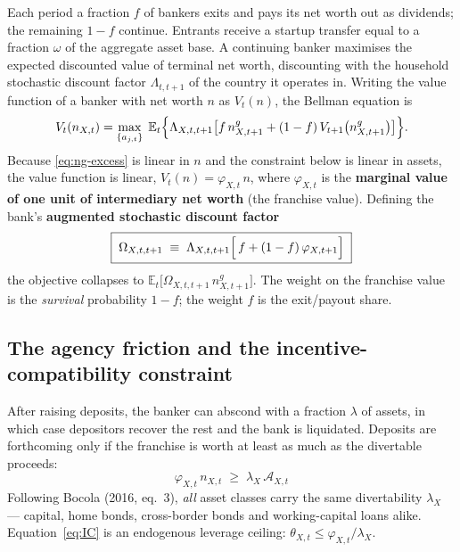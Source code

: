 \documentclass[11pt]{article}
\numberwithin{equation}{section}
\newcommand{\E}{\mathbb{E}}
\theoremstyle{definition}
\theoremstyle{plain}
\theoremstyle{remark}
\begin{document}
Each period a fraction $f$ of bankers exits and pays its net worth out as dividends;
the remaining $1-f$ continue. Entrants receive a startup transfer equal to a fraction
$\omega$ of the aggregate asset base. A continuing banker maximises the expected
discounted value of terminal net worth, discounting with the household stochastic
discount factor $\Lambda_{t,t+1}$ of the country it operates in. Writing the value
function of a banker with net worth $n$ as $V_t(n)$, the Bellman equation is
\begin{equation}
V_t(n_{X,t})
=\max_{\{a_{j,t}\}}\;
\E_t\Bigl\{\Lambda_{X,t,t+1}\bigl[
   f\,n^{g}_{X,t+1}+(1-f)\,V_{t+1}\bigl(n^{g}_{X,t+1}\bigr)\bigr]\Bigr\}.
\label{eq:bank-bellman}
\end{equation}
Because \eqref{eq:ng-excess} is linear in $n$ and the constraint below is linear in
assets, the value function is linear, $V_t(n)=\varphi_{X,t}\,n$, where
$\varphi_{X,t}$ is the \textbf{marginal value of one unit of intermediary net
worth} (the franchise value). Defining the bank's \textbf{augmented stochastic
discount factor}
\begin{equation}
\boxed{\;
\Omega_{X,t,t+1}\;\equiv\;\Lambda_{X,t,t+1}\Bigl[\,f+(1-f)\,\varphi_{X,t+1}\Bigr]\;}
\label{eq:omega}
\end{equation}
the objective collapses to $\E_t\bigl[\Omega_{X,t,t+1}\,n^{g}_{X,t+1}\bigr]$. The
weight on the franchise value is the \emph{survival} probability $1-f$; the weight
$f$ is the exit/payout share.

\subsection{The agency friction and the incentive-compatibility constraint}

After raising deposits, the banker can abscond with a fraction $\lambda$ of assets,
in which case depositors recover the rest and the bank is liquidated. Deposits are
forthcoming only if the franchise is worth at least as much as the divertable
proceeds:
\begin{equation}
\boxed{\;\varphi_{X,t}\,n_{X,t}\;\ge\;\lambda_X\,\mathcal{A}_{X,t}\;}
\label{eq:IC}
\end{equation}
Following Bocola (2016, eq.~3), \emph{all} asset classes carry the same divertability
$\lambda_X$ --- capital, home bonds, cross-border bonds and working-capital loans
alike. Equation~\eqref{eq:IC} is an endogenous leverage ceiling:
$\theta_{X,t}\le\varphi_{X,t}/\lambda_X$.
\end{document}
